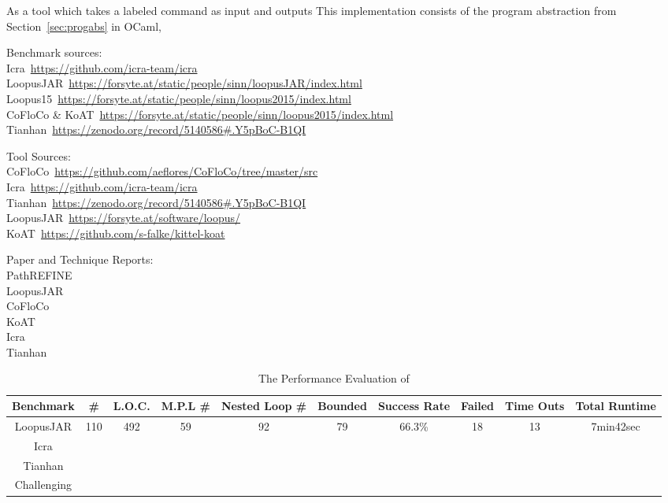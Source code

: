 As a tool which takes a labeled command as input  
and outputs 
This implementation consists of the 
program abstraction from Section~\ref{sec:progabs} in OCaml,

Benchmark sources:
\\
Icra~\hyperlink{Icra}{https://github.com/icra-team/icra}
\\
LoopusJAR~\hyperlink{LoopusJAR}{https://forsyte.at/static/people/sinn/loopusJAR/index.html}
\\
Loopus15~\hyperlink{Loopus15}{https://forsyte.at/static/people/sinn/loopus2015/index.html}
\\
CoFloCo \& KoAT~\hyperlink{CoFloCo \& KoAT}{https://forsyte.at/static/people/sinn/loopus2015/index.html}
\\
Tianhan~\hyperlink{Tianhan}{https://zenodo.org/record/5140586\#.Y5pBoC-B1QI}


Tool Sources:
\\
CoFloCo~\hyperlink{CoFloCo}{https://github.com/aeflores/CoFloCo/tree/master/src}
\\
Icra~\hyperlink{Icra}{https://github.com/icra-team/icra}
\\
Tianhan~\hyperlink{Tianhan}{https://zenodo.org/record/5140586\#.Y5pBoC-B1QI}
\\
LoopusJAR~\hyperlink{LoopusJAR}{https://forsyte.at/software/loopus/}
\\
KoAT~\hyperlink{KoAT}{https://github.com/s-falke/kittel-koat}

Paper and Technique Reports:
\\
PathREFINE~\cite{GulwaniJK09}
\\
LoopusJAR~\cite{sinn2017complexity}
\\
CoFloCo~\cite{Montoya17, Flores-Montoya16, Flores-MontoyaH14}
\\
KoAT~\cite{BrockschmidtEFFG14, FalkeKS12, FalkeKS11}
\\
Icra~\cite{KincaidBCR19, CyphertBKR19}
\\
Tianhan~\cite{LuCT21}


\begin{table}[H]
    \caption{The Performance Evaluation of {\THESYSTEM}}
    \label{tb:performance-eval}
    \centering
        {\small
        \begin{tabular}{ >{\small}c | c | c | c | c | c | c | c | c | c }
            Benchmark & \#  & L.O.C. & M.P.L \# & Nested Loop \#  & Bounded & Success Rate & Failed & Time Outs  & Total Runtime \\
            \hline
            LoopusJAR & 110 & 492 & 59  & 92  & 79 & 66.3\% & 18 &  13 & 7min42sec \\
            \hline
            Icra & & & & & & & & \\
            \hline
            Tianhan & & & & & & & & \\
            \hline
            Challenging & & & & & & & & \\
            \hline
        \end{tabular}
        }
    \end{table}

